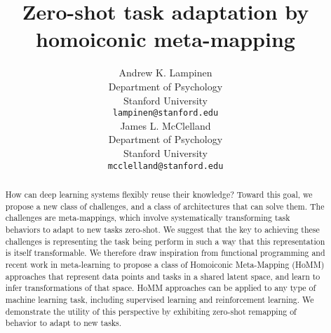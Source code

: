 \documentclass{article}
\begin{document}
\title{Zero-shot task adaptation by homoiconic meta-mapping}
\author{%
Andrew K. Lampinen\\
Department of Psychology\\
Stanford University\\
\texttt{lampinen@stanford.edu}\\
\And
James L. McClelland\\
Department of Psychology\\
Stanford University\\
\texttt{mcclelland@stanford.edu}\\
}
\date{}
\maketitle

\begin{abstract}
How can deep learning systems flexibly reuse their knowledge? Toward this goal, we propose a new class of challenges, and a class of architectures that can solve them. The challenges are meta-mappings, which involve systematically transforming task behaviors to adapt to new tasks zero-shot. We suggest that the key to achieving these challenges is representing the task being perform in such a way that this representation is itself transformable. We therefore draw inspiration from functional programming and recent work in meta-learning to propose a class of Homoiconic Meta-Mapping (HoMM) approaches that represent data points and tasks in a shared latent space, and learn to infer transformations of that space. HoMM approaches can be applied to any type of machine learning task, including supervised learning and reinforcement learning. We demonstrate the utility of this perspective by exhibiting zero-shot remapping of behavior to adapt to new tasks.
\end{abstract}

\end{document}
